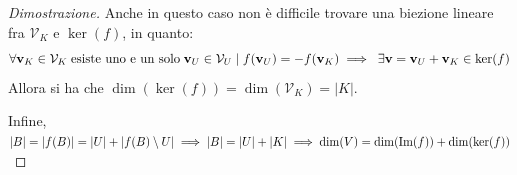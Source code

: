 \documentclass{article}
\begin{document}
\begin{proof}[Dimostrazione]
    Anche in questo caso non è difficile trovare una biezione lineare fra $\mathcal{V}_K$ e $\ker(f)$, in quanto:
    \[
        \forall \mathbf{v}_K \in \mathcal{V}_K \; \textnormal{esiste uno e un solo} \; \mathbf{v}_U \in \mathcal{V}_U \; | \; f(\mathbf{v}_U) = -f(\mathbf{v}_K) \implies \; \exists \mathbf{v} = \mathbf{v}_U + \mathbf{v}_K \in \ker(f)
    \]
    Allora si ha che $\dim(\ker(f)) = \dim(\mathcal{V}_K) = |K|$.

    \vspace{10pt}
    Infine, $|B| = |f(B)| = |U| + |f(B) \setminus U| \implies |B| = |U| + |K| \implies \dim(V) = \dim(\textnormal{Im}(f)) + \dim(\ker(f))$
\end{proof}
\end{document}
